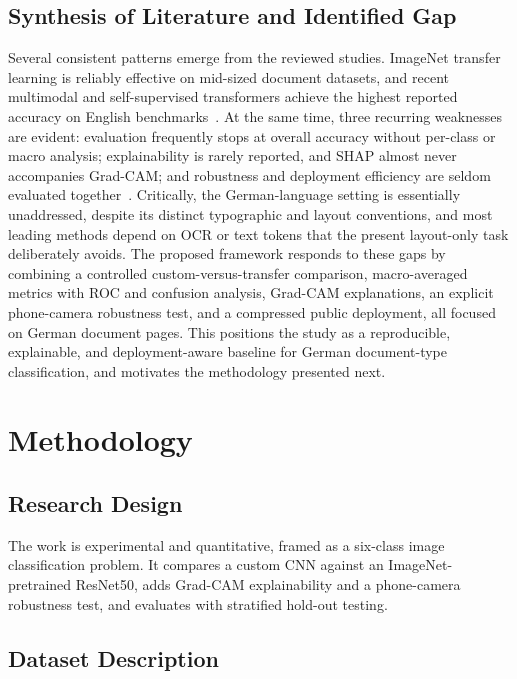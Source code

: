 \documentclass[preprint,12pt]{elsarticle}
\begin{document}
\subsection{Synthesis of Literature and Identified Gap}
Several consistent patterns emerge from the reviewed studies.
ImageNet transfer learning is reliably effective on mid-sized document datasets,
and recent multimodal and self-supervised transformers achieve the highest
reported accuracy on English benchmarks~\cite{xu2020layoutlm,huang2022layoutlmv3,li2022dit,bakkali2023vlcdoc}.
At the same time, three recurring weaknesses are evident: evaluation frequently
stops at overall accuracy without per-class or macro analysis; explainability is
rarely reported, and SHAP almost never accompanies Grad-CAM; and robustness and
deployment efficiency are seldom evaluated together~\cite{saifullah2022robust}.
Critically, the German-language setting is essentially unaddressed, despite its
distinct typographic and layout conventions, and most leading methods depend on
OCR or text tokens that the present layout-only task deliberately avoids.
The proposed framework responds to these gaps by combining a controlled
custom-versus-transfer comparison, macro-averaged metrics with ROC and confusion
analysis, Grad-CAM explanations, an explicit phone-camera robustness test, and a
compressed public deployment, all focused on German document pages.
This positions the study as a reproducible, explainable, and deployment-aware
baseline for German document-type classification, and motivates the methodology
presented next.

\section{Methodology}\label{sec:method}

\subsection{Research Design}
The work is experimental and quantitative, framed as a six-class image
classification problem.
It compares a custom CNN against an ImageNet-pretrained ResNet50, adds Grad-CAM
explainability and a phone-camera robustness test, and evaluates with stratified
hold-out testing.

\subsection{Dataset Description}
\end{document}

